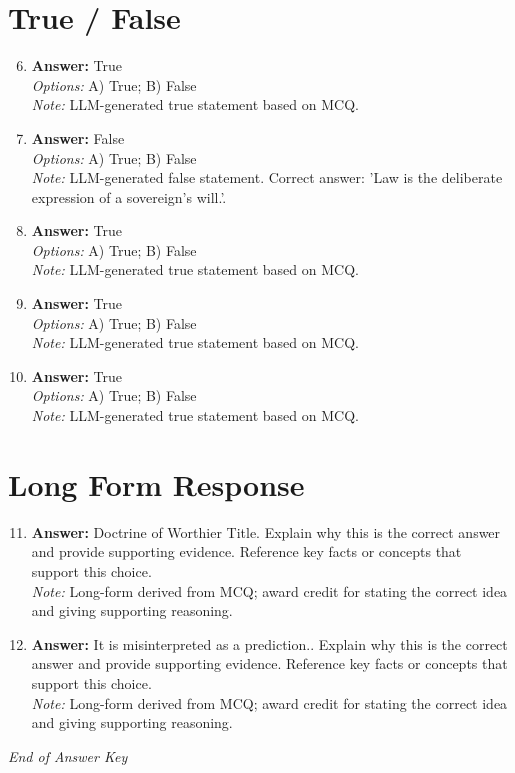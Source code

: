 \documentclass[12pt]{article}
\begin{document}
\section*{True / False}
\begin{enumerate}[label=\arabic*.]
\setcounter{enumi}{5}
\item \textbf{Answer:} True
\\ \textit{Options:} A) True; B) False
\\ \textit{Note:} LLM-generated true statement based on MCQ.
\item \textbf{Answer:} False
\\ \textit{Options:} A) True; B) False
\\ \textit{Note:} LLM-generated false statement. Correct answer: 'Law is the deliberate expression of a sovereign's will.'.
\item \textbf{Answer:} True
\\ \textit{Options:} A) True; B) False
\\ \textit{Note:} LLM-generated true statement based on MCQ.
\item \textbf{Answer:} True
\\ \textit{Options:} A) True; B) False
\\ \textit{Note:} LLM-generated true statement based on MCQ.
\item \textbf{Answer:} True
\\ \textit{Options:} A) True; B) False
\\ \textit{Note:} LLM-generated true statement based on MCQ.
\end{enumerate}

\section*{Long Form Response}
\begin{enumerate}[label=\arabic*.]
\setcounter{enumi}{10}
\item \textbf{Answer:} Doctrine of Worthier Title. Explain why this is the correct answer and provide supporting evidence. Reference key facts or concepts that support this choice.
\\ \textit{Note:} Long-form derived from MCQ; award credit for stating the correct idea and giving supporting reasoning.
\item \textbf{Answer:} It is misinterpreted as a prediction.. Explain why this is the correct answer and provide supporting evidence. Reference key facts or concepts that support this choice.
\\ \textit{Note:} Long-form derived from MCQ; award credit for stating the correct idea and giving supporting reasoning.
\end{enumerate}

\vfill
\noindent\textit{End of Answer Key}
\end{document}
